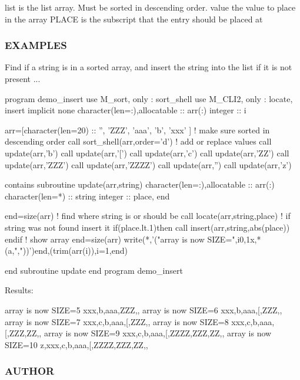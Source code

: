 \begin{DoxyVerb}list    is the list array. Must be sorted in descending order.
value   the value to place in the array
PLACE   is the subscript that the entry should be placed at
\end{DoxyVerb}


\subsubsection*{E\+X\+A\+M\+P\+L\+ES}

Find if a string is in a sorted array, and insert the string into the list if it is not present ... \begin{DoxyVerb}program demo_insert
use M_sort, only : sort_shell
use M_CLI2, only : locate, insert
implicit none
character(len=:),allocatable :: arr(:)
integer                       :: i

arr=[character(len=20) :: '', 'ZZZ', 'aaa', 'b', 'xxx' ]
! make sure sorted in descending order
call sort_shell(arr,order='d')
! add or replace values
call update(arr,'b')
call update(arr,'[')
call update(arr,'c')
call update(arr,'ZZ')
call update(arr,'ZZZ')
call update(arr,'ZZZZ')
call update(arr,'')
call update(arr,'z')

contains
subroutine update(arr,string)
character(len=:),allocatable :: arr(:)
character(len=*)             :: string
integer                      :: place, end

end=size(arr)
! find where string is or should be
call locate(arr,string,place)
! if string was not found insert it
if(place.lt.1)then
   call insert(arr,string,abs(place))
endif
! show array
end=size(arr)
write(*,'("array is now SIZE=",i0,1x,*(a,","))')end,(trim(arr(i)),i=1,end)

end subroutine update
end program demo_insert
\end{DoxyVerb}


Results\+:

array is now S\+I\+ZE=5 xxx,b,aaa,Z\+ZZ,, array is now S\+I\+ZE=6 xxx,b,aaa,\mbox{[},Z\+ZZ,, array is now S\+I\+ZE=7 xxx,c,b,aaa,\mbox{[},Z\+ZZ,, array is now S\+I\+ZE=8 xxx,c,b,aaa,\mbox{[},Z\+ZZ,ZZ,, array is now S\+I\+ZE=9 xxx,c,b,aaa,\mbox{[},Z\+Z\+ZZ,Z\+ZZ,ZZ,, array is now S\+I\+ZE=10 z,xxx,c,b,aaa,\mbox{[},Z\+Z\+ZZ,Z\+ZZ,ZZ,,

\subsubsection*{A\+U\+T\+H\+OR}

